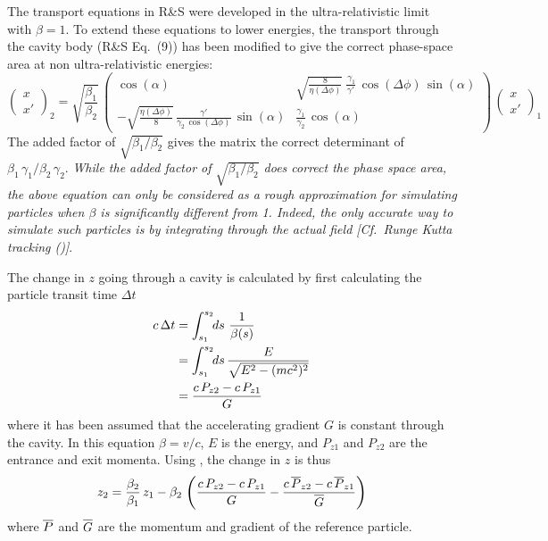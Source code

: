 The transport equations in R\&S were developed in the ultra-relativistic limit with $\beta = 1$.  To
extend these equations to lower energies, the transport through the cavity body (R\&S Eq.~(9)) has
been modified to give the correct phase-space area at non ultra-relativistic energies:
\begin{equation}
  \begin{pmatrix}
    x \\ 
    x'
  \end{pmatrix}_2 = \sqrt{\frac{\beta_1}{\beta_2}} \, 
  \begin{pmatrix}
    \cos(\alpha)  &
        \sqrt{\frac{8}{\eta(\Delta\phi)}} \, \frac{\, \gamma_1}{\gamma'} \, \cos(\Delta\phi) \, \sin(\alpha) \\
    -\sqrt{\frac{\eta(\Delta\phi)}{8}} \, \frac{\gamma'}{\gamma_2 \, \cos(\Delta\phi)} \, \sin(\alpha) &
        \frac{\gamma_1}{\gamma_2} \, \cos(\alpha)
  \end{pmatrix}
  \,
  \begin{pmatrix}
    x \\ 
    x'
  \end{pmatrix}_1
  \label{xxpc}
\end{equation}
The added factor of $\sqrt{\beta_1/\beta_2}$ gives the matrix the correct determinant of $\beta_1 \,
\gamma_1 / \beta_2 \, \gamma_2$. {\em While the added factor of $\sqrt{\beta_1/\beta_2}$ does
correct the phase space area, the above equation can only be considered as a rough approximation for
simulating particles when $\beta$ is significantly different from 1. Indeed, the only accurate way
to simulate such particles is by integrating through the actual field [Cf.~Runge Kutta tracking
()]}.

The change in $z$ going through a cavity is calculated by first calculating the particle
transit time $\Delta t$
\begin{align}
  c \, \Delta t &= \int_{s_1}^{s_2} \!\! ds \,\, \frac{1}{\beta(s)} \nonumber \\
  &= \int_{s_1}^{s_2} \!\! ds \, \frac{E}{\sqrt{E^2 - (mc^2)^2}} \\
  &= \frac{c \, P_{z2} - c \, P_{z1}}{G} \nonumber
\end{align}
where it has been assumed that the accelerating gradient $G$ is constant through the cavity. In this
equation $\beta = v / c$, $E$ is the energy, and $P_{z1}$ and $P_{z2}$ are the entrance and exit
momenta. Using , the change in $z$ is thus
\begin{equation}
  z_2 = \frac{\beta_2}{\beta_1} \, z_1 - 
  \beta_2 \, 
  \left(
  \frac{c \, P_{z2} - c \, P_{z1}}{G} - 
  \frac{c \, \Pbar_{z2} - c \, \Pbar_{z1}}{\BAR G}
  \right)
\end{equation}
where $\overline{P}$ and $\BAR G$ are the momentum and gradient of the
reference particle.

